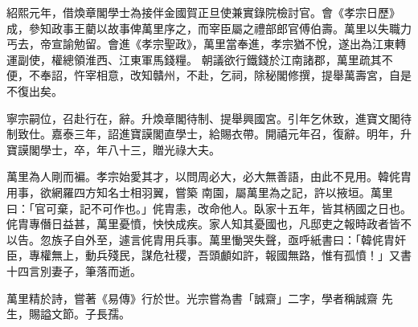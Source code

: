 \begin{pinyinscope}
 紹熙元年，借煥章閣學士為接伴金國賀正旦使兼實錄院檢討官。會《孝宗日歷》成，參知政事王藺以故事俾萬里序之，而宰臣屬之禮部郎官傅伯壽。萬里以失職力丐去，帝宣諭勉留。會進《孝宗聖政》，萬里當奉進，孝宗猶不悅，遂出為江東轉運副使，權總領淮西、江東軍馬錢糧。
 朝議欲行鐵錢於江南諸郡，萬里疏其不便，不奉詔，忤宰相意，改知贛州，不赴，乞祠，除秘閣修撰，提舉萬壽宮，自是不復出矣。



 寧宗嗣位，召赴行在，辭。升煥章閣待制、提舉興國宮。引年乞休致，進寶文閣待制致仕。嘉泰三年，詔進寶謨閣直學士，給賜衣帶。開禧元年召，復辭。明年，升寶謨閣學士，卒，年八十三，贈光祿大夫。



 萬里為人剛而褊。孝宗始愛其才，以問周必大，必大無善語，由此不見用。韓侂胄用事，欲網羅四方知名士相羽翼，嘗築
 南園，屬萬里為之記，許以掖垣。萬里曰：「官可棄，記不可作也。」侂胄恚，改命他人。臥家十五年，皆其柄國之日也。侂胄專僭日益甚，萬里憂憤，怏怏成疾。家人知其憂國也，凡邸吏之報時政者皆不以告。忽族子自外至，遽言侂胄用兵事。萬里慟哭失聲，亟呼紙書曰：「韓侂胄奸臣，專權無上，動兵殘民，謀危社稷，吾頭顱如許，報國無路，惟有孤憤！」又書十四言別妻子，筆落而逝。



 萬里精於詩，嘗著《易傳》行於世。光宗嘗為書「誠齋」二字，學者稱誠齋
 先生，賜謚文節。子長孺。



\end{pinyinscope}